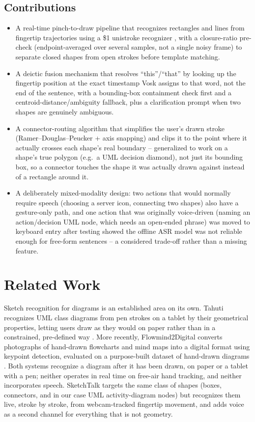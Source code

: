 \documentclass[sigconf]{acmart}
\begin{document}
\subsection{Contributions}
\begin{itemize}
  \item A real-time pinch-to-draw pipeline that recognizes rectangles and
    lines from fingertip trajectories using a \$1 unistroke recognizer
    \cite{wobbrock2007}, with a closure-ratio pre-check (endpoint-averaged
    over several samples, not a single noisy frame) to separate closed
    shapes from open strokes before template matching.
  \item A deictic fusion mechanism that resolves ``this''/``that'' by
    looking up the fingertip position at the exact timestamp Vosk assigns
    to that word, not the end of the sentence, with a bounding-box
    containment check first and a centroid-distance/ambiguity fallback,
    plus a clarification prompt when two shapes are genuinely ambiguous.
  \item A connector-routing algorithm that simplifies the user's drawn
    stroke (Ramer--Douglas--Peucker + axis snapping) and clips it to the
    point where it actually crosses each shape's real boundary --
    generalized to work on a shape's true polygon (e.g.\ a UML decision
    diamond), not just its bounding box, so a connector touches the shape
    it was actually drawn against instead of a rectangle around it.
  \item A deliberately mixed-modality design: two actions that would
    normally require speech (choosing a server icon, connecting two
    shapes) also have a gesture-only path, and one action that was
    originally voice-driven (naming an action/decision UML node, which
    needs an open-ended phrase) was moved to keyboard entry after testing
    showed the offline ASR model was not reliable enough for free-form
    sentences -- a considered trade-off rather than a missing feature.
\end{itemize}

\section{Related Work}
Sketch recognition for diagrams is an established area on its own. Tahuti
recognizes UML class diagrams from pen strokes on a tablet by their
geometrical properties, letting users draw as they would on paper rather
than in a constrained, pre-defined way \cite{tahuti2002}. More recently,
Flowmind2Digital converts photographs of hand-drawn flowcharts and mind
maps into a digital format using keypoint detection, evaluated on a
purpose-built dataset of hand-drawn diagrams \cite{flowmind2024}. Both
systems recognize a diagram after it has been drawn, on paper or a tablet
with a pen; neither operates in real time on free-air hand tracking, and
neither incorporates speech. SketchTalk targets the same class of shapes
(boxes, connectors, and in our case UML activity-diagram nodes) but
recognizes them live, stroke by stroke, from webcam-tracked fingertip
movement, and adds voice as a second channel for everything that is not
geometry.
\end{document}
